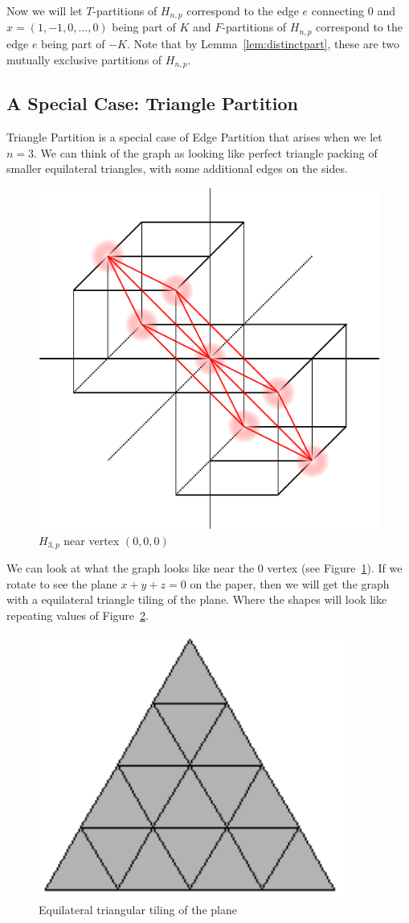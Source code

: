 \documentclass[runningheads,a4paper]{llncs}
\begin{document}
Now we will let $T$-partitions of $H_{n,p}$ correspond to the edge $e$ connecting $0$ and $x = (1, -1, 0, \dots, 0)$ being part of $K$ and $F$-partitions of $H_{n,p}$ correspond to the edge $e$ being part of $-K$. Note that by Lemma~\ref{lem:distinctpart}, these are two mutually exclusive partitions of $H_{n,p}$.

\subsection{A Special Case: Triangle Partition}

Triangle Partition is a special case of Edge Partition that arises when we let $n = 3$. We can think of the graph as looking like perfect triangle packing of smaller equilateral triangles, with some additional edges on the sides.

\begin{figure}[h]
\label{fig:H3at0}
\centering
\includegraphics[width=0.5\linewidth]{h3at0.pdf}
\caption{$H_{3,p}$ near vertex $(0,0,0)$}
\end{figure}

We can look at what the graph looks like near the 0 vertex (see Figure~\ref{fig:H3at0}).
If we rotate to see the plane $x + y + z = 0$ on the paper, then we will get the graph with a equilateral triangle tiling of the plane. Where the shapes will look like repeating values of Figure~\ref{fig:triangletiling}.

\begin{figure}[h]
\label{fig:triangletiling}
\centering
\includegraphics[width=0.2\linewidth]{EdgePartitionPic1.pdf}
\caption{Equilateral triangular tiling of the plane}
\end{figure}
\end{document}
